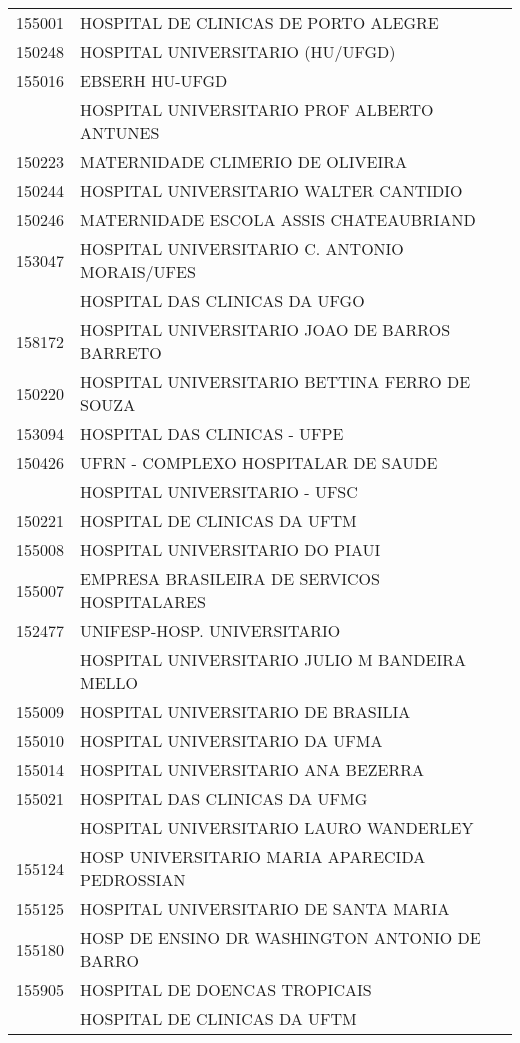 \documentclass[
  letterpaper,
  DIV=11,
  numbers=noendperiod]{scrartcl}
\begin{document}
\begin{longtable}[t]{ll}
155001 & HOSPITAL DE CLINICAS DE PORTO ALEGRE\\
150248 & HOSPITAL UNIVERSITARIO (HU/UFGD)\\
155016 & EBSERH HU-UFGD\\
\addlinespace
150229 & HOSPITAL UNIVERSITARIO PROF ALBERTO ANTUNES\\
150223 & MATERNIDADE CLIMERIO DE OLIVEIRA\\
150244 & HOSPITAL UNIVERSITARIO WALTER CANTIDIO\\
150246 & MATERNIDADE ESCOLA ASSIS CHATEAUBRIAND\\
153047 & HOSPITAL UNIVERSITARIO C. ANTONIO MORAIS/UFES\\
\addlinespace
153054 & HOSPITAL DAS CLINICAS DA UFGO\\
158172 & HOSPITAL UNIVERSITARIO JOAO DE BARROS BARRETO\\
150220 & HOSPITAL UNIVERSITARIO BETTINA FERRO DE SOUZA\\
153094 & HOSPITAL DAS CLINICAS - UFPE\\
150426 & UFRN - COMPLEXO HOSPITALAR DE SAUDE\\
\addlinespace
150232 & HOSPITAL UNIVERSITARIO - UFSC\\
150221 & HOSPITAL DE CLINICAS DA UFTM\\
155008 & HOSPITAL UNIVERSITARIO DO PIAUI\\
155007 & EMPRESA BRASILEIRA DE SERVICOS HOSPITALARES\\
152477 & UNIFESP-HOSP. UNIVERSITARIO\\
\addlinespace
158705 & HOSPITAL UNIVERSITARIO JULIO M BANDEIRA MELLO\\
155009 & HOSPITAL UNIVERSITARIO DE BRASILIA\\
155010 & HOSPITAL UNIVERSITARIO DA UFMA\\
155014 & HOSPITAL UNIVERSITARIO ANA BEZERRA\\
155021 & HOSPITAL DAS CLINICAS DA UFMG\\
\addlinespace
155023 & HOSPITAL UNIVERSITARIO LAURO WANDERLEY\\
155124 & HOSP UNIVERSITARIO MARIA APARECIDA PEDROSSIAN\\
155125 & HOSPITAL UNIVERSITARIO DE SANTA MARIA\\
155180 & HOSP DE ENSINO DR WASHINGTON ANTONIO DE BARRO\\
155905 & HOSPITAL DE DOENCAS TROPICAIS\\
\addlinespace
155011 & HOSPITAL DE CLINICAS DA UFTM\\

\end{longtable}
\end{document}
